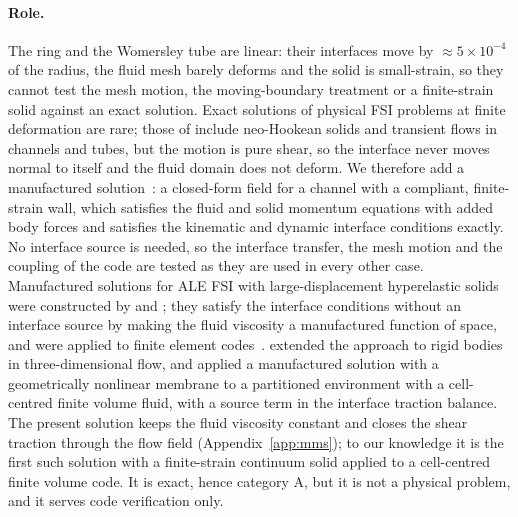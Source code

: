 \paragraph{Role.}
The ring and the Womersley tube are linear: their interfaces move by $\approx5\times10^{-4}$ of the radius, the fluid mesh barely deforms and the solid is small-strain, so they cannot test the mesh motion, the moving-boundary treatment or a finite-strain solid against an exact solution.
Exact solutions of physical FSI problems at finite deformation are rare; those of \citet{Hessenthaler2020} include neo-Hookean solids and transient flows in channels and tubes, but the motion is pure shear, so the interface never moves normal to itself and the fluid domain does not deform.
We therefore add a manufactured solution~\citep{Roache2002}: a closed-form field for a channel with a compliant, finite-strain wall, which satisfies the fluid and solid momentum equations with added body forces and satisfies the kinematic and dynamic interface conditions exactly.
No interface source is needed, so the interface transfer, the mesh motion and the coupling of the code are tested as they are used in every other case.
Manufactured solutions for ALE FSI with large-displacement hyperelastic solids were constructed by \citet{Tremblay2006} and \citet{Etienne2012}; they satisfy the interface conditions without an interface source by making the fluid viscosity a manufactured function of space, and were applied to finite element codes~\citep{Etienne2012, LaSpina2020}. \citet{Yu2015} extended the approach to rigid bodies in three-dimensional flow, and \citet{Fisch2014} applied a manufactured solution with a geometrically nonlinear membrane to a partitioned environment with a cell-centred finite volume fluid, with a source term in the interface traction balance.
The present solution keeps the fluid viscosity constant and closes the shear traction through the flow field (Appendix~\ref{app:mms}); to our knowledge it is the first such solution with a finite-strain continuum solid applied to a cell-centred finite volume code.
It is exact, hence category A, but it is not a physical problem, and it serves code verification only.

